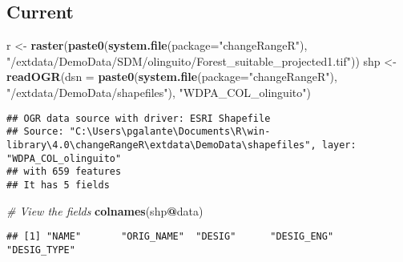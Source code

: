 \documentclass[
]{article}
\newenvironment{Shaded}{\begin{snugshade}}{\end{snugshade}}
\newcommand{\CommentTok}[1]{\textcolor[rgb]{0.56,0.35,0.01}{\textit{#1}}}
\newcommand{\DataTypeTok}[1]{\textcolor[rgb]{0.13,0.29,0.53}{#1}}
\newcommand{\KeywordTok}[1]{\textcolor[rgb]{0.13,0.29,0.53}{\textbf{#1}}}
\newcommand{\NormalTok}[1]{#1}
\newcommand{\OperatorTok}[1]{\textcolor[rgb]{0.81,0.36,0.00}{\textbf{#1}}}
\newcommand{\StringTok}[1]{\textcolor[rgb]{0.31,0.60,0.02}{#1}}
\begin{document}
\hypertarget{current}{%
\subsection{Current}\label{current}}

\begin{Shaded}
\begin{Highlighting}[]
\NormalTok{r <-}\StringTok{ }\KeywordTok{raster}\NormalTok{(}\KeywordTok{paste0}\NormalTok{(}\KeywordTok{system.file}\NormalTok{(}\DataTypeTok{package=}\StringTok{"changeRangeR"}\NormalTok{), }\StringTok{"/extdata/DemoData/SDM/olinguito/Forest_suitable_projected1.tif"}\NormalTok{))}
\NormalTok{shp <-}\StringTok{ }\KeywordTok{readOGR}\NormalTok{(}\DataTypeTok{dsn =} \KeywordTok{paste0}\NormalTok{(}\KeywordTok{system.file}\NormalTok{(}\DataTypeTok{package=}\StringTok{"changeRangeR"}\NormalTok{), }\StringTok{"/extdata/DemoData/shapefiles"}\NormalTok{), }\StringTok{"WDPA_COL_olinguito"}\NormalTok{)}
\end{Highlighting}
\end{Shaded}

\begin{verbatim}
## OGR data source with driver: ESRI Shapefile 
## Source: "C:\Users\pgalante\Documents\R\win-library\4.0\changeRangeR\extdata\DemoData\shapefiles", layer: "WDPA_COL_olinguito"
## with 659 features
## It has 5 fields
\end{verbatim}

\begin{Shaded}
\begin{Highlighting}[]
\CommentTok{# View the fields}
\KeywordTok{colnames}\NormalTok{(shp}\OperatorTok{@}\NormalTok{data)}
\end{Highlighting}
\end{Shaded}

\begin{verbatim}
## [1] "NAME"       "ORIG_NAME"  "DESIG"      "DESIG_ENG"  "DESIG_TYPE"
\end{verbatim}

\begin{Shaded}
\end{Shaded}
\end{document}
